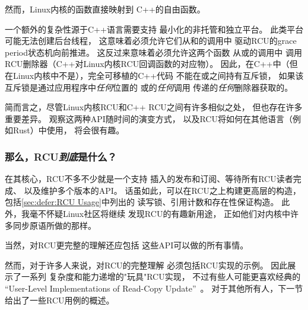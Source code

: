 然而，Linux内核的函数直接映射到
C++的自由函数。

一个额外的复杂性源于C++语言需要支持
最小化的非托管和独立平台。
此类平台可能无法创建后台线程，
这意味着必须允许它们从和的调用中
驱动RCU的grace period状态机向前推进。
这反过来意味着必须允许这两个函数
从或的调用中
调用RCU删除器（C++对Linux内核RCU回调函数的对应物）。
因此，在C++中（但在Linux内核中不是），完全可移植的C++代码
不能在或之间持有互斥锁，
如果该互斥锁是通过应用程序中\emph{任何}位置的
或的\emph{任何}调用
传递的\emph{任何}删除器获取的。

简而言之，尽管Linux内核RCU和C++ RCU之间有许多相似之处，
但也存在许多重要差异。
观察这两种API随时间的演变方式，
以及RCU将如何在其他语言（例如Rust）中使用，
将会很有趣。

\subsubsection{那么，RCU\emph{到底}是什么？}
\label{sec:defer:So; What is RCU Really?}

在其核心，RCU不多不少就是一个支持
插入的发布和订阅、等待所有RCU读者完成、
以及维护多个版本的API。
话虽如此，可以在RCU之上构建更高层的构造，
包括\cref{sec:defer:RCU Usage}中列出的
读写锁、引用计数和存在性保证构造。
此外，我毫不怀疑Linux社区将继续
发现RCU的有趣新用途，
正如他们对内核中许多同步原语所做的那样。

当然，对RCU更完整的理解还应包括
这些API可以做的所有事情。

然而，对于许多人来说，对RCU的完整理解
必须包括RCU实现的示例。
因此展示了一系列
复杂度和能力递增的"玩具"RCU实现，
不过有些人可能更喜欢经典的
``User-Level Implementations of Read-Copy
Update''~\cite{MathieuDesnoyers2012URCU}。
对于其他所有人，下一节给出了一些RCU用例的概述。
